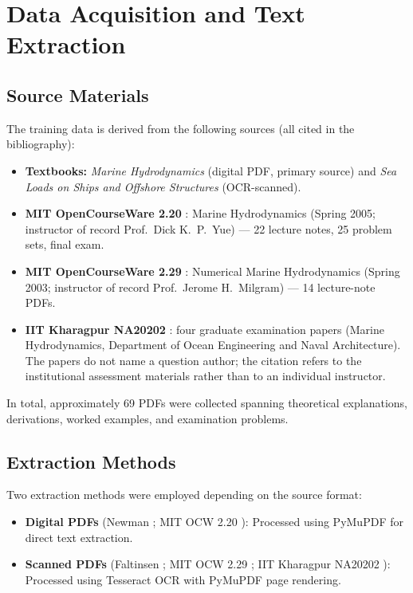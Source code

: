 \documentclass[12pt]{report}
\begin{document}
\section{Data Acquisition and Text Extraction}

\subsection{Source Materials}
\label{sec:source_materials}

The training data is derived from the following sources (all cited in the bibliography):

\begin{itemize}
    \item \textbf{Textbooks:} \emph{Marine Hydrodynamics} \citep{newman1977marine} (digital PDF, primary source) and \emph{Sea Loads on Ships and Offshore Structures} \citep{faltinsen1993sea} (OCR-scanned).
    \item \textbf{MIT OpenCourseWare 2.20} \citep{mitocw220}: Marine Hydrodynamics (Spring 2005; instructor of record Prof.\ Dick K.~P.~Yue) --- 22 lecture notes, 25 problem sets, final exam.
    \item \textbf{MIT OpenCourseWare 2.29} \citep{mitocw229}: Numerical Marine Hydrodynamics (Spring 2003; instructor of record Prof.\ Jerome H.~Milgram) --- 14 lecture-note PDFs.
    \item \textbf{IIT Kharagpur NA20202} \citep{iitkgp_na20202_exams}: four graduate examination papers (Marine Hydrodynamics, Department of Ocean Engineering and Naval Architecture). The papers do not name a question author; the citation refers to the institutional assessment materials rather than to an individual instructor.
\end{itemize}

In total, approximately 69 PDFs were collected spanning theoretical explanations, derivations, worked examples, and examination problems.

\subsection{Extraction Methods}

Two extraction methods were employed depending on the source format:

\begin{itemize}
    \item \textbf{Digital PDFs} (Newman \citep{newman1977marine}; MIT OCW 2.20 \citep{mitocw220}): Processed using PyMuPDF for direct text extraction.
    \item \textbf{Scanned PDFs} (Faltinsen \citep{faltinsen1993sea}; MIT OCW 2.29 \citep{mitocw229}; IIT Kharagpur NA20202 \citep{iitkgp_na20202_exams}): Processed using Tesseract OCR with PyMuPDF page rendering.
\end{itemize}
\end{document}
